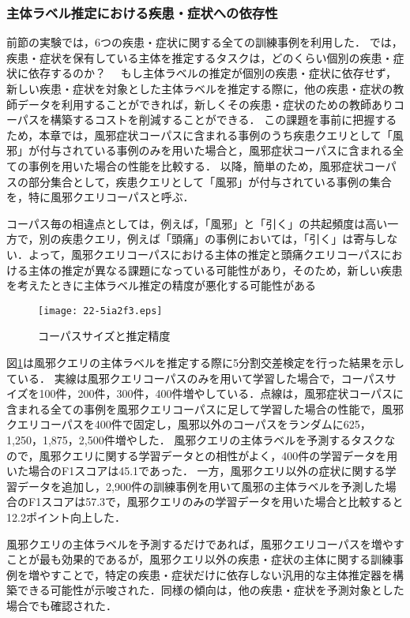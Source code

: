 \documentclass[japanese]{jnlp_1.4}
\begin{document}
\subsubsection{主体ラベル推定における疾患・症状への依存性}

前節の実験では，6つの疾患・症状に関する全ての訓練事例を利用した．
では，疾患・症状を保有している主体を推定するタスクは，どのくらい個別の疾患・症状に依存するのか？　
もし主体ラベルの推定が個別の疾患・症状に依存せず，新しい疾患・症状を対象とした主体ラベルを推定する際に，他の疾患・症状の教師データを利用することができれば，新しくその疾患・症状のための教師ありコーパスを構築するコストを削減することができる．
この課題を事前に把握するため，本章では，風邪症状コーパスに含まれる事例のうち疾患クエリとして「風邪」が付与されている事例のみを用いた場合と，風邪症状コーパスに含まれる全ての事例を用いた場合の性能を比較する．
以降，簡単のため，風邪症状コーパスの部分集合として，疾患クエリとして「風邪」が付与されている事例の集合を，特に風邪クエリコーパスと呼ぶ．

コーパス毎の相違点としては，例えば，「風邪」と「引く」の共起頻度は高い一方で，別の疾患クエリ，例えば「頭痛」の事例においては，「引く」は寄与しない．よって，風邪クエリコーパスにおける主体の推定と頭痛クエリコーパスにおける主体の推定が異なる課題になっている可能性があり，そのため，新しい疾患を考えたときに主体ラベル推定の精度が悪化する可能性がある

\begin{figure}[b]
  \begin{center}
  \texttt{[image: 22-5ia2f3.eps]}
 \end{center}
  \caption{コーパスサイズと推定精度}
  \label{CorpusFigure}
\end{figure}

図\ref{CorpusFigure}は風邪クエリの主体ラベルを推定する際に5分割交差検定を行った結果を示している．
実線は風邪クエリコーパスのみを用いて学習した場合で，コーパスサイズを100件，200件，300件，400件増やしている．点線は，風邪症状コーパスに含まれる全ての事例を風邪クエリコーパスに足して学習した場合の性能で，風邪クエリコーパスを400件で固定し，風邪以外のコーパスをランダムに625，1,250，1,875，2,500件増やした．
風邪クエリの主体ラベルを予測するタスクなので，風邪クエリに関する学習データとの相性がよく，400件の学習データを用いた場合のF1スコアは45.1であった．
一方，風邪クエリ以外の症状に関する学習データを追加し，2,900件の訓練事例を用いて風邪の主体ラベルを予測した場合のF1スコアは57.3で，風邪クエリのみの学習データを用いた場合と比較すると12.2ポイント向上した．

風邪クエリの主体ラベルを予測するだけであれば，風邪クエリコーパスを増やすことが最も効果的であるが，風邪クエリ以外の疾患・症状の主体に関する訓練事例を増やすことで，特定の疾患・症状だけに依存しない汎用的な主体推定器を構築できる可能性が示唆された．同様の傾向は，他の疾患・症状を予測対象とした場合でも確認された．
\end{document}
